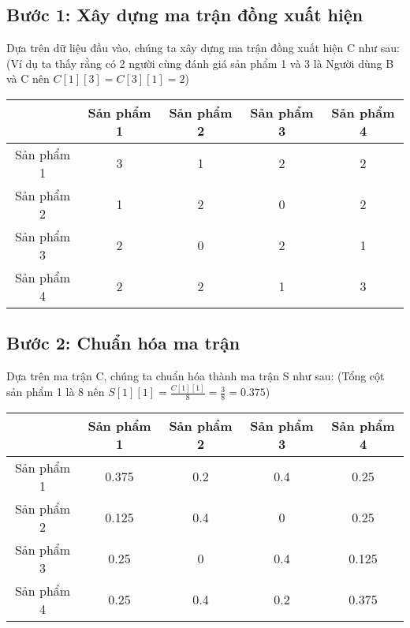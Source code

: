 \subsection*{Bước 1: Xây dựng ma trận đồng xuất hiện}
Dựa trên dữ liệu đầu vào, chúng ta xây dựng ma trận đồng xuất hiện C như sau:
(Ví dụ ta thấy rằng có 2 người cùng đánh giá sản phẩm 1 và 3 là Người dùng B và C
nên $C[1][3] = C[3][1] = 2$)\\
\vspace{0.2cm}
{\centering
    \begin{tabular}{ |c|c|c|c|c| }
        \hline
                   & Sản phẩm 1 & Sản phẩm 2 & Sản phẩm 3 & Sản phẩm 4 \\
        \hline
        Sản phẩm 1 & 3          & 1          & 2          & 2          \\
        \hline
        Sản phẩm 2 & 1          & 2          & 0          & 2          \\
        \hline
        Sản phẩm 3 & 2          & 0          & 2          & 1          \\
        \hline
        Sản phẩm 4 & 2          & 2          & 1          & 3          \\
        \hline
    \end{tabular}
    \par}

\subsection*{Bước 2: Chuẩn hóa ma trận}
Dựa trên ma trận C, chúng ta chuẩn hóa thành ma trận S như sau:
(Tổng cột sản phẩm 1 là 8 nên $S[1][1] = \frac{C[1][1]}{8} = \frac{3}{8} = 0.375$)\\
\vspace{0.2cm}
{\centering
    \begin{tabular}{ |c|c|c|c|c| }
        \hline
                   & Sản phẩm 1 & Sản phẩm 2 & Sản phẩm 3 & Sản phẩm 4 \\
        \hline
        Sản phẩm 1 & 0.375      & 0.2        & 0.4        & 0.25       \\
        \hline
        Sản phẩm 2 & 0.125      & 0.4        & 0          & 0.25       \\
        \hline
        Sản phẩm 3 & 0.25       & 0          & 0.4        & 0.125      \\
        \hline
        Sản phẩm 4 & 0.25       & 0.4        & 0.2        & 0.375      \\
        \hline
    \end{tabular}
    \par}

